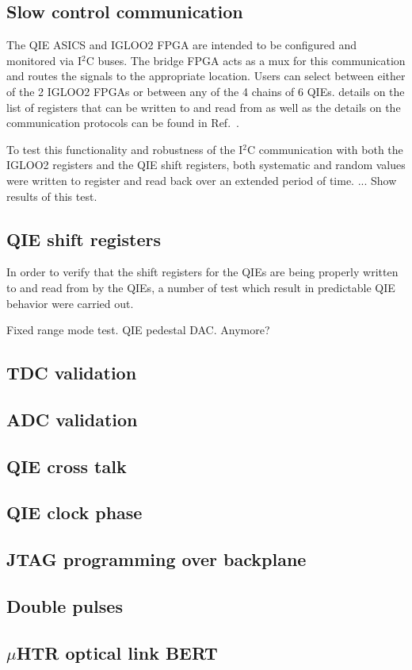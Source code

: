 \documentclass[11pt]{article} %
\begin{document}
\subsection{Slow control communication}

The QIE ASICS and IGLOO2 FPGA are intended to be configured and monitored via I$^2$C buses.  The
bridge FPGA acts as a mux for this communication and routes the signals to the appropriate location.  
Users can select between either of the 2 IGLOO2 FPGAs or between any of the 4 chains of 6 QIEs.  details 
on the list of registers that can be written to and read from as well as the details on the communication
protocols can be found in Ref.~\cite{BridgeSpecs}.  

To test this functionality and robustness of the I$^2$C communication with both the IGLOO2 registers and the
QIE shift registers, both systematic and random values were written to register and read back over an extended 
period of time.  ... Show results of this test.

\subsection{QIE shift registers}

In order to verify that the shift registers for the QIEs are being properly written to and read from by the QIEs, 
a number of test which result in predictable QIE behavior were carried out.  

Fixed range mode test.  QIE pedestal DAC.  Anymore?

\subsection{TDC validation}

\subsection{ADC validation}

\subsection{QIE cross talk}

\subsection{QIE clock phase}

\subsection{JTAG programming over backplane}

\subsection{Double pulses}

\subsection{$\mu$HTR optical link BERT}
\end{document}
